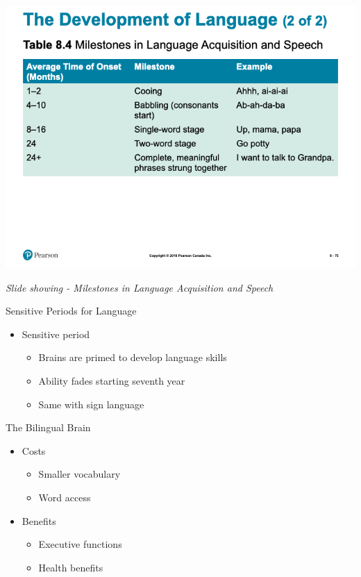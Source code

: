 \documentclass[
]{book}
\providecommand{\tightlist}{%
  \setlength{\itemsep}{0pt}\setlength{\parskip}{0pt}}
\begin{document}
\includegraphics{assets/unit_1/slide_75.png}

\emph{Slide showing - Milestones in Language Acquisition and Speech}

Sensitive Periods for Language

\begin{itemize}
\tightlist
\item
  Sensitive period

  \begin{itemize}
  \tightlist
  \item
    Brains are primed to develop language skills\\
  \item
    Ability fades starting seventh year\\
  \item
    Same with sign language
  \end{itemize}
\end{itemize}

The Bilingual Brain

\begin{itemize}
\tightlist
\item
  Costs

  \begin{itemize}
  \tightlist
  \item
    Smaller vocabulary\\
  \item
    Word access
  \end{itemize}
\item
  Benefits

  \begin{itemize}
  \tightlist
  \item
    Executive functions\\
  \item
    Health benefits
  \end{itemize}
\end{itemize}
\end{document}
